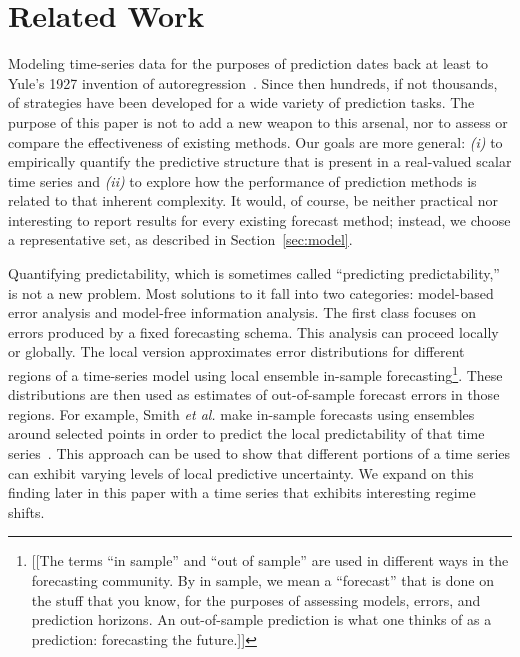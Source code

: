 \section{Related Work }\label{sec:related}

Modeling time-series data for the purposes of prediction dates back at
least to Yule's 1927 invention of autoregression~\cite{Yule27}.  Since
then hundreds, if not thousands, of strategies have been developed for
a wide variety of prediction tasks.  The purpose of this paper is not
to add a new weapon to this arsenal, nor to assess or compare the
effectiveness of existing methods.  Our goals are more general: {\sl
  (i)} to empirically quantify the predictive structure that is
present in a real-valued scalar time series and {\sl (ii)} to explore
how the performance of prediction methods is related to that inherent
complexity.  It would, of course, be neither practical nor interesting
to report results for every existing forecast method; instead, we
choose a representative set, as described in Section~\ref{sec:model}.

Quantifying predictability, which is sometimes called ``predicting
predictability,'' is not a new problem.  Most solutions to it fall
into two categories: model-based error analysis and model-free
information analysis.
%
%
%
The first class focuses on errors produced by a fixed forecasting
schema.  This analysis can proceed locally or globally.  The local
version approximates error distributions for different regions of a
time-series model using local ensemble in-sample
forecasting\footnote{[[The terms ``in sample'' and ``out of sample''
      are used in different ways in the forecasting community.  By in
      sample, we mean a ``forecast'' that is done on the stuff that
      you know, for the purposes of assessing models, errors, and
      prediction horizons.  An out-of-sample prediction is what one
      thinks of as a prediction: forecasting the future.]]}.  These
distributions are then used as estimates of out-of-sample forecast
errors in those regions.  For example, Smith {\sl et al.}  make
in-sample forecasts using ensembles around selected points in order to
predict the local predictability of that time
series~\cite{Smith199250}.  This approach can be used to show that
different portions of a time series can exhibit varying levels of
local predictive uncertainty.  We expand on this finding later in this
paper with a time series that exhibits interesting regime shifts.

